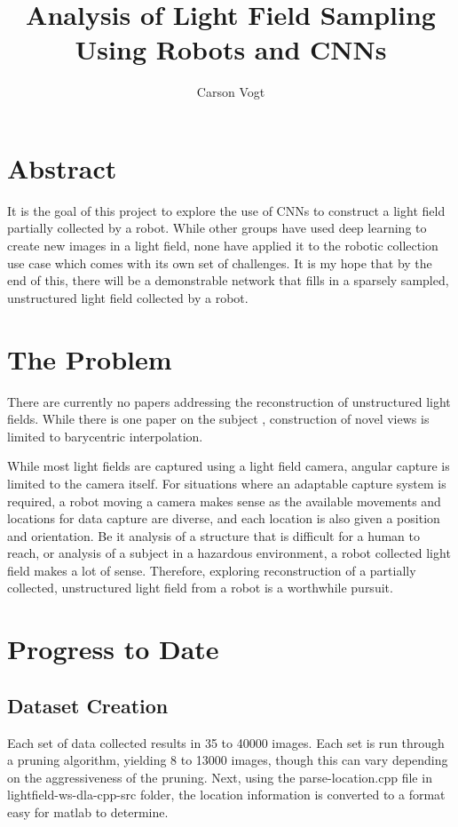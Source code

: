 \documentclass[12pt]{report}
\begin{document}
\title{Analysis of Light Field Sampling Using Robots and CNNs \vspace{2.5cm}}	
\author{
\Large Carson Vogt \vspace{1cm} \\ 
}


\maketitle

\section*{Abstract}
It is the goal of this project to explore the use of CNNs to construct a light field partially collected by a robot. While other groups have used deep learning to create new images in a light field, none have applied it to the robotic collection use case which comes with its own set of challenges. It is my hope that by the end of this, there will be a demonstrable network that fills in a sparsely sampled, unstructured light field collected by a robot. 

\section*{The Problem}
There are currently no papers addressing the reconstruction of unstructured light fields. While there is one paper on the subject \cite{Davis12}, construction of novel views is limited to barycentric interpolation. 

While most light fields are captured using a light field camera, angular capture is limited to the camera itself. For situations where an adaptable capture system is required, a robot moving a camera makes sense as the available movements and locations for data capture are diverse, and each location is also given a position and orientation. Be it analysis of a structure that is difficult for a human to reach, or analysis of a subject in a hazardous environment, a robot collected light field makes a lot of sense. Therefore, exploring reconstruction of a partially collected, unstructured light field from a robot is a worthwhile pursuit. 

\section*{Progress to Date}
\subsection*{Dataset Creation}
Each set of data collected results in 35 to 40000 images. Each set is run through a pruning algorithm, yielding 8 to 13000 images, though this can vary depending on the aggressiveness of the pruning.
Next, using the parse-location.cpp file in lightfield-ws-dla-cpp-src folder, the location information is converted to a format easy for matlab to determine.
\end{document}
